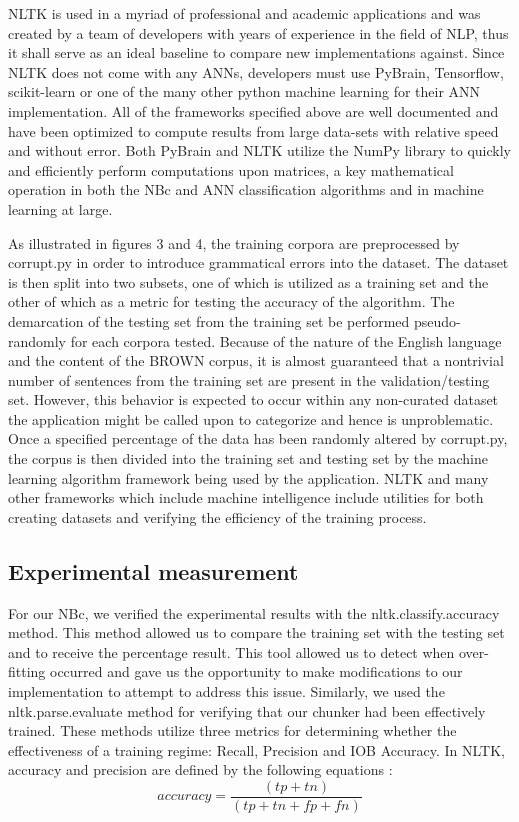 \documentclass{article}
\begin{document}
NLTK is used in a myriad of professional and academic applications and was created by a team of developers with years of experience in the field of NLP, thus it shall serve as an ideal baseline to compare new implementations against. Since NLTK does not come with any ANNs, developers must use PyBrain, Tensorflow, scikit-learn or one of the many other python machine learning for their ANN implementation. All of the frameworks specified above are well documented and have been optimized to compute results from large data-sets with relative speed and without error. Both PyBrain and NLTK utilize the NumPy library to quickly and efficiently perform computations upon matrices, a key mathematical operation in both the  NBc and ANN classification algorithms and in machine learning at large. 

As illustrated in figures 3 and 4, the training corpora are preprocessed by corrupt.py in order to introduce grammatical errors into the dataset. The dataset is then split into two subsets, one of which is utilized as a training set and the other of which as a metric for testing the accuracy of the algorithm. The demarcation of the testing set from the training set be performed pseudo-randomly for each corpora tested. Because of the nature of the English language and the content of the BROWN corpus, it is almost guaranteed that a nontrivial number of sentences from the training set are present in the validation/testing set. However, this behavior is expected to occur within any non-curated dataset the application might be called upon to categorize and hence is unproblematic.  Once a specified percentage of the data has been randomly altered by corrupt.py, the corpus is then divided into the training set and testing set by the machine learning algorithm framework being used by the application.
NLTK and many other frameworks which include machine intelligence include utilities for both creating datasets and verifying the efficiency of the training process.


\subsection{Experimental measurement}
For our NBc, we verified the experimental results with the nltk.classify.accuracy method. This method allowed us to compare the training set with the testing set and to receive the percentage result. This tool allowed us to detect when over-fitting occurred and gave us the opportunity to make modifications to our implementation to attempt to address this issue. Similarly, we used the nltk.parse.evaluate method for verifying that our chunker had been effectively trained. These methods utilize three metrics for determining whether the effectiveness of a training regime: Recall, Precision and IOB Accuracy. In NLTK, accuracy and precision are defined by the following equations \citep{NLTKCH7}: 
$$accuracy = \frac{(tp + tn)}{(tp + tn + fp + fn)}$$
\end{document}
